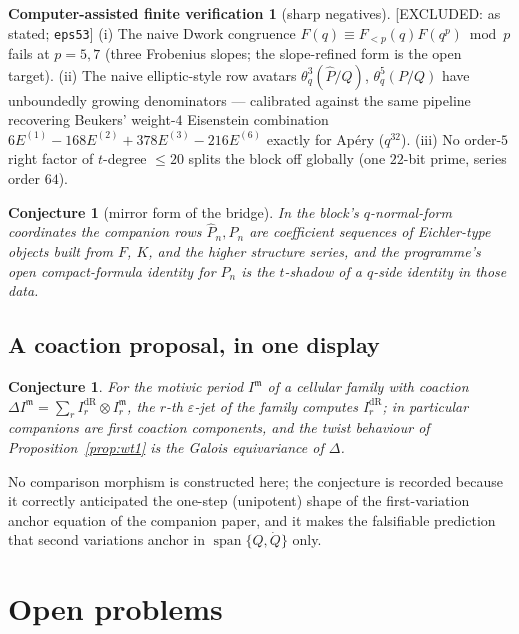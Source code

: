 \documentclass[11pt,reqno]{amsart}
\theoremstyle{plain}
\newtheorem{conjecture}[theorem]{Conjecture}
\theoremstyle{definition}
\newtheorem{verification}[theorem]{Computer-assisted finite verification}
\theoremstyle{remark}
\newcommand{\thq}{\theta_q}
\newcommand{\ExcludedR}[1]{\textup{\textsf{[EXCLUDED: #1]}}}
\begin{document}
\begin{verification}[sharp negatives]\label{ver:mirrornegs}
\ExcludedR{as stated; \texttt{eps53}}\quad
(i) The naive Dwork congruence $F(q)\equiv F_{<p}(q)F(q^p)\bmod p$ fails
at $p=5,7$ (three Frobenius slopes; the slope-refined form is the open
target). (ii) The naive elliptic-style row avatars
$\thq^3(\hat P/Q)$, $\thq^5(P/Q)$ have unboundedly growing denominators
--- calibrated against the same pipeline recovering Beukers' weight-$4$
Eisenstein combination $6E^{(1)}-168E^{(2)}+378E^{(3)}-216E^{(6)}$ exactly
for Ap\'ery ($q^{32}$). (iii) No order-$5$ right factor of $t$-degree
$\le20$ splits the block off globally (one $22$-bit prime, series order
$64$).
\end{verification}

\begin{conjecture}[mirror form of the bridge]\label{conj:mirrorbridge}
In the block's $q$-normal-form coordinates the companion rows
$\hat P_n,P_n$ are coefficient sequences of Eichler-type objects built
from $F$, $K$, and the higher structure series, and the programme's open
compact-formula identity for $P_n$ is the $t$-shadow of a $q$-side
identity in those data.
\end{conjecture}

\subsection{A coaction proposal, in one display}
\begin{conjecture}\label{conj:coaction}
For the motivic period $I^{\mathfrak m}$ of a cellular family with
coaction $\Delta I^{\mathfrak m}=\sum_rI^{\mathrm{dR}}_r\otimes
I^{\mathfrak m}_r$, the $r$-th $\varepsilon$-jet of the family computes
$I^{\mathrm{dR}}_r$; in particular companions are first coaction
components, and the twist behaviour of
Proposition~\ref{prop:wt1} is the Galois equivariance of $\Delta$.
\end{conjecture}
No comparison morphism is constructed here; the conjecture is recorded
because it correctly anticipated the one-step (unipotent) shape of the
first-variation anchor equation of the companion paper, and it makes the
falsifiable prediction that second variations anchor in
$\operatorname{span}\{Q,\dot Q\}$ only.

\section{Open problems}\label{sec:open}
\end{document}
